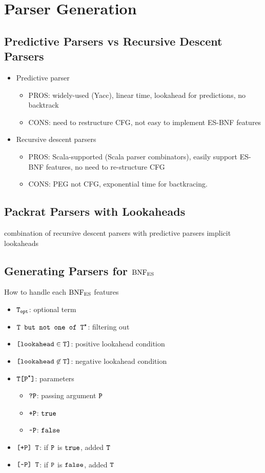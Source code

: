 \section{Parser Generation}

\subsection{Predictive Parsers vs Recursive Descent Parsers}
\begin{itemize}
  \item Predictive parser
    \begin{itemize}
      \item PROS: widely-used (Yacc), linear time, lookahead for predictions, no backtrack
      \item CONS: need to restructure CFG, not easy to implement ES-BNF features
    \end{itemize}
  \item Recursive descent parsers
    \begin{itemize}
      \item PROS: Scala-supported (Scala parser combinators), easily support ES-BNF features, no need to re-structure CFG
      \item CONS: PEG not CFG, exponential time for bactkracing.
    \end{itemize}
\end{itemize}

\subsection{Packrat Parsers with Lookaheads}
combination of recursive descent parsers with predictive parsers
implicit lookaheads

\subsection{Generating Parsers for \( \text{BNF}_\text{ES} \)}
How to handle each \( \text{BNF}_\text{ES} \) features
\begin{itemize}
  \item \( \texttt{T}_{\texttt{opt}} \): optional term
  \item \( \texttt{T but not one of T}^{\texttt{*}} \): filtering out
  \item \( \texttt{[lookahead} \in \texttt{T]} \): positive lookahead condition
  \item \( \texttt{[lookahead} \not\in \texttt{T]} \): negative lookahead condition
  \item \( \texttt{T[P}^{\texttt{*}}\texttt{]} \): parameters
    \begin{itemize}
      \item \( \texttt{?P} \): passing argument \( \texttt{P} \)
      \item \( \texttt{+P} \): \( \texttt{true} \)
      \item \( \texttt{\textasciitilde}\texttt{P} \): \( \texttt{false} \)
    \end{itemize}
  \item \; \( \texttt{[+P] T} \): if \( \texttt{P} \) is \( \texttt{true} \), added \( \texttt{T} \)
  \item \; \( \texttt{[\textasciitilde}\texttt{P] T} \): if \( \texttt{P} \) is \( \texttt{false} \), added \( \texttt{T} \)
\end{itemize}
